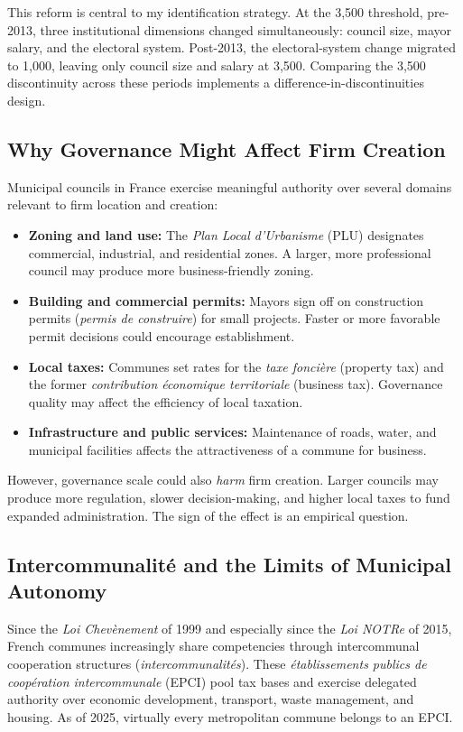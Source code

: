 \documentclass[12pt]{article}
\begin{document}
This reform is central to my identification strategy. At the 3,500 threshold, pre-2013, three institutional dimensions changed simultaneously: council size, mayor salary, and the electoral system. Post-2013, the electoral-system change migrated to 1,000, leaving only council size and salary at 3,500. Comparing the 3,500 discontinuity across these periods implements a difference-in-discontinuities design.

\subsection{Why Governance Might Affect Firm Creation}

Municipal councils in France exercise meaningful authority over several domains relevant to firm location and creation:

\begin{itemize}
\item \textbf{Zoning and land use:} The \textit{Plan Local d'Urbanisme} (PLU) designates commercial, industrial, and residential zones. A larger, more professional council may produce more business-friendly zoning.
\item \textbf{Building and commercial permits:} Mayors sign off on construction permits (\textit{permis de construire}) for small projects. Faster or more favorable permit decisions could encourage establishment.
\item \textbf{Local taxes:} Communes set rates for the \textit{taxe fonci\`{e}re} (property tax) and the former \textit{contribution \'{e}conomique territoriale} (business tax). Governance quality may affect the efficiency of local taxation.
\item \textbf{Infrastructure and public services:} Maintenance of roads, water, and municipal facilities affects the attractiveness of a commune for business.
\end{itemize}

However, governance scale could also \textit{harm} firm creation. Larger councils may produce more regulation, slower decision-making, and higher local taxes to fund expanded administration. The sign of the effect is an empirical question.

\subsection{Intercommunalit\'{e} and the Limits of Municipal Autonomy}

Since the \textit{Loi Chevènement} of 1999 and especially since the \textit{Loi NOTRe} of 2015, French communes increasingly share competencies through intercommunal cooperation structures (\textit{intercommunalit\'{e}s}). These \textit{\'{e}tablissements publics de coop\'{e}ration intercommunale} (EPCI) pool tax bases and exercise delegated authority over economic development, transport, waste management, and housing. As of 2025, virtually every metropolitan commune belongs to an EPCI.
\end{document}
